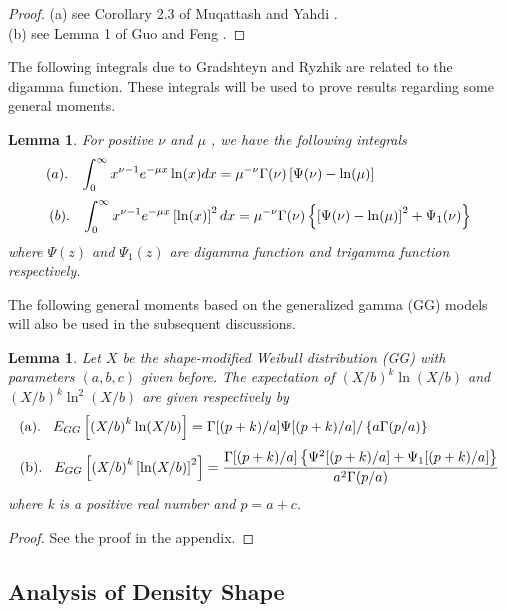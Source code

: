 \documentclass{ps}
\theoremstyle{plain}%
\newtheorem{lemma}[theorem]{Lemma}
\theoremstyle{definition}
\theoremstyle{remark}
\begin{document}
\begin{proof}
	(a)  see Corollary 2.3 of Muqattash and Yahdi \cite{Muqattash-Yahdi-2006}.\\
	(b)  see Lemma 1 of Guo and Feng \cite{Guo-Feng-2013}.  
\end{proof}

The following integrals due to Gradshteyn and Ryzhik \cite{Gradshteyn-Ryzhik-2007} are related to the digamma function. These integrals will be used to prove results regarding some general moments.

\begin{lemma}\label{lemma3.3}
	For positive $\nu$ and $\mu$ , we have the following integrals
	$$ (a). \hspace{3mm}\int_0^\infty x^{\nu-1}e^{-\mu x} \ln(x) dx = \mu^{-\nu}\Gamma(\nu)\left[\Psi(\nu) - \ln(\mu)\right]\hspace{25mm}$$
	$$ (b). \hspace{3mm}\int_0^\infty x^{\nu-1}e^{-\mu x} \left[\ln(x)\right]^2 dx = \mu^{-\nu}\Gamma(\nu)\left\{ \left[ \Psi(\nu) - \ln(\mu) \right]^2 +\Psi_1(\nu) \right\}$$ 
	where $\Psi(z)$  and $\Psi_1(z)$  are digamma function and trigamma function respectively. 
\end{lemma}

The following general moments based on the generalized gamma (GG) models will also be used in the subsequent discussions.

\begin{lemma}\label{lemma3.4}
	Let $X$ be the shape-modified Weibull distribution (GG) with parameters $(a, b, c)$ given before. The expectation of $(X/b)^k\ln(X/b)$ and $(X/b)^k\ln^2(X/b)$ are given respectively by 
	$$\mbox{(a)}. \hspace{3mm}E_{GG}\left[\left(X/b\right)^k \ln(X/b)\right] = \Gamma[(p+k)/a]\Psi[(p+k)/a]/\left\{ a\Gamma(p/a)\right\}\hspace{10mm}  \ \ \ \ \ \ \ 
	$$
	$$\mbox{(b)}. \hspace{3mm}E_{GG}\left[\left(X/b\right)^k \left[\ln(X/b)\right]^2\right] = \frac{\Gamma[(p+k)/a]\left\{\Psi^2[(p+k)/a] +\Psi_1[(p+k)/a]\right\}}{ a^2\Gamma(p/a)}$$
	where k is a positive real number and $p = a + c$. 
\end{lemma}

\begin{proof}
	See the proof in the appendix. 
\end{proof}

\subsection{Analysis of Density Shape}\label{subsec:density-shape}
\end{document}
